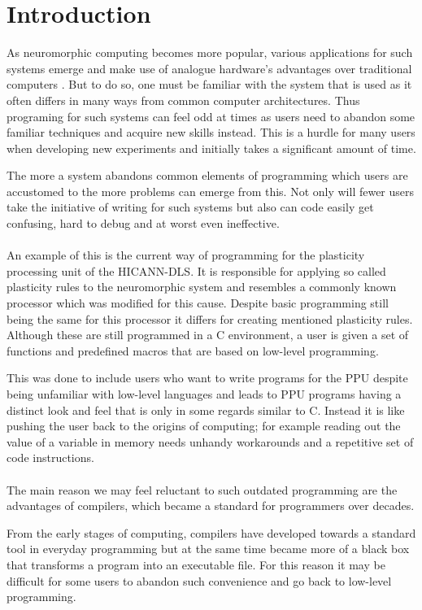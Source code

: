 \chapter{Introduction}
\label{chapter:introduction}

As neuromorphic computing becomes more popular, various  applications for such systems emerge and make use of analogue hardware's advantages over traditional computers .
But to do so, one must be familiar with the system that is used as it often differs in many ways from common computer architectures.
Thus programing for such systems can feel odd at times as users need to abandon some familiar techniques and acquire new skills instead.
This is a hurdle for many users when developing new experiments and initially takes a significant amount of time. 

The more a system abandons common elements of programming which users are accustomed to the more problems can emerge from this.
Not only will fewer users take the initiative of writing for such systems but also can code easily get confusing, hard to debug and at worst even ineffective.
\\
\\
An example of this is the current way of programming for the plasticity processing unit of the HICANN-DLS. 
It is responsible for applying so called plasticity rules to the neuromorphic system and resembles a commonly known processor which was modified for this cause.
Despite basic programming still being the same for this processor it differs for creating mentioned plasticity rules.
Although these are still programmed in a C environment, a user is given a set of functions and predefined macros that are based on low-level programming.

This was done to include users who want to write programs for the PPU despite being unfamiliar with low-level languages and leads to PPU programs having a distinct look and feel that is only in some regards similar to C.
Instead it is like pushing the user back to the origins of computing; for example reading out the value of a variable in memory needs unhandy workarounds and a repetitive set of code instructions.
\\
\\
The main reason we may feel reluctant to such outdated programming are the advantages of compilers, which became a standard for programmers over decades.

From the early stages of computing, compilers have developed towards a standard tool in everyday programming but at the same time became more of a black box that transforms a program into an executable file.
For this reason it may be difficult for some users to abandon such convenience and go back to low-level programming.


